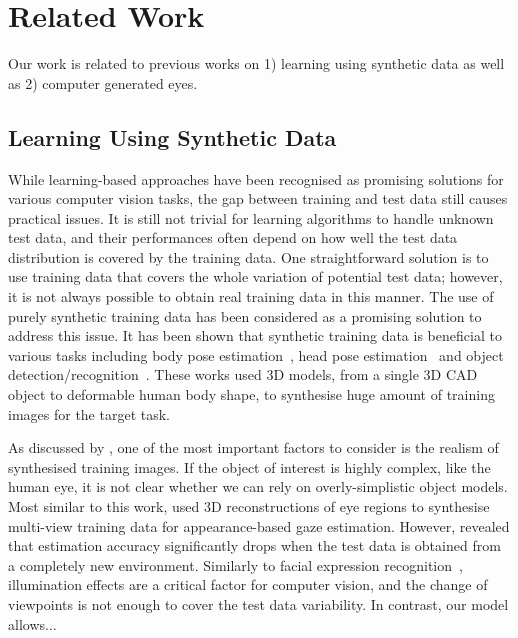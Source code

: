 
\section{Related Work}

Our work is related to previous works on 1) learning using synthetic data as well as 2) computer generated eyes.

\subsection{Learning Using Synthetic Data}

While learning-based approaches have been recognised as promising solutions for various computer vision tasks, the gap between training and test data still causes practical issues.
It is still not trivial for learning algorithms to handle unknown test data, and their performances often depend on how well the test data distribution is covered by the training data.
One straightforward solution is to use training data that covers the whole variation of potential test data; however, it is not always possible to obtain real training data in this manner.
The use of purely synthetic training data has been considered as a promising solution to address this issue.
It has been shown that synthetic training data is beneficial to various tasks including body pose estimation~\cite{shakhnarovich2003fast,okada2008relevant,shotton2013real}, head pose estimation~\cite{fanelli2011real} and object detection/recognition~\cite{yu2010improving,liebelt2010multiview,jaderberg2014synthetic}.
These works used 3D models, from a single 3D CAD object to deformable human body shape, to synthesise huge amount of training images for the target task.

As discussed by \citet{kaneva2011evaluation}, one of the most important factors to consider is the realism of synthesised training images.
If the object of interest is highly complex, like the human eye, it is not clear whether we can rely on overly-simplistic object models.
Most similar to this work, \citet{sugano2014learning} used 3D reconstructions of eye regions to synthesise multi-view training data for appearance-based gaze estimation.
However, \citet{zhang15_cvpr} revealed that estimation accuracy significantly drops when the test data is obtained from a completely new environment.
Similarly to facial expression recognition~\cite{stratou2011effect}, illumination effects are a critical factor for computer vision, and the change of viewpoints is not enough to cover the test data variability.
In contrast, our model allows...

